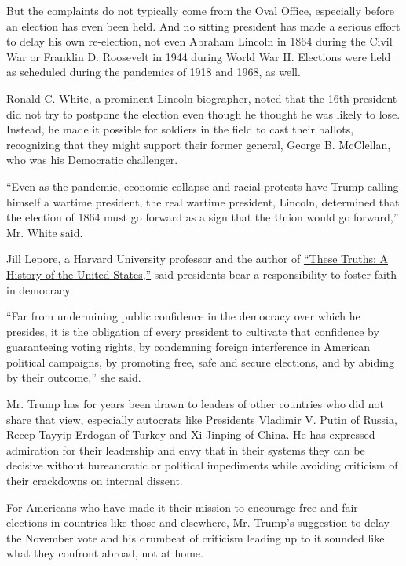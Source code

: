 But the complaints do not typically come from the Oval Office,
especially before an election has even been held. And no sitting
president has made a serious effort to delay his own re-election, not
even Abraham Lincoln in 1864 during the Civil War or Franklin D.
Roosevelt in 1944 during World War II. Elections were held as scheduled
during the pandemics of 1918 and 1968, as well.

Ronald C. White, a prominent Lincoln biographer, noted that the 16th
president did not try to postpone the election even though he thought he
was likely to lose. Instead, he made it possible for soldiers in the
field to cast their ballots, recognizing that they might support their
former general, George B. McClellan, who was his Democratic challenger.

``Even as the pandemic, economic collapse and racial protests have Trump
calling himself a wartime president, the real wartime president,
Lincoln, determined that the election of 1864 must go forward as a sign
that the Union would go forward,'' Mr. White said.

Jill Lepore, a Harvard University professor and the author of
\href{https://www.nytimes3xbfgragh.onion/2018/09/14/books/review/jill-lepore-these-truths.html}{``These
Truths: A History of the United States,''} said presidents bear a
responsibility to foster faith in democracy.

``Far from undermining public confidence in the democracy over which he
presides, it is the obligation of every president to cultivate that
confidence by guaranteeing voting rights, by condemning foreign
interference in American political campaigns, by promoting free, safe
and secure elections, and by abiding by their outcome,'' she said.

Mr. Trump has for years been drawn to leaders of other countries who did
not share that view, especially autocrats like Presidents Vladimir V.
Putin of Russia, Recep Tayyip Erdogan of Turkey and Xi Jinping of China.
He has expressed admiration for their leadership and envy that in their
systems they can be decisive without bureaucratic or political
impediments while avoiding criticism of their crackdowns on internal
dissent.

For Americans who have made it their mission to encourage free and fair
elections in countries like those and elsewhere, Mr. Trump's suggestion
to delay the November vote and his drumbeat of criticism leading up to
it sounded like what they confront abroad, not at home.

